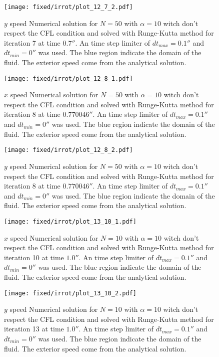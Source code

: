 \begin{figure}
\texttt{[image: fixed/irrot/plot\_12\_7\_2.pdf]}
\caption{$y$ speed Numerical solution for $N=50$ with $\alpha=10$ witch don't respect the CFL condition and solved with Runge-Kutta method
for iteration 7 at time $\unit{0.7}{\second}$.
An time step limiter of $dt_{max}=\unit{0.1}{\second}$ and $dt_{min}=\unit{0}{\second}$ was used.
The blue region indicate the domain of the fluid. The exterior speed come from the analytical solution.
}
\end{figure}
\begin{figure}
\texttt{[image: fixed/irrot/plot\_12\_8\_1.pdf]}
\caption{$x$ speed Numerical solution for $N=50$ with $\alpha=10$ witch don't respect the CFL condition and solved with Runge-Kutta method
for iteration 8 at time $\unit{0.770046}{\second}$.
An time step limiter of $dt_{max}=\unit{0.1}{\second}$ and $dt_{min}=\unit{0}{\second}$ was used.
The blue region indicate the domain of the fluid. The exterior speed come from the analytical solution.
}
\end{figure}
\begin{figure}
\texttt{[image: fixed/irrot/plot\_12\_8\_2.pdf]}
\caption{$y$ speed Numerical solution for $N=50$ with $\alpha=10$ witch don't respect the CFL condition and solved with Runge-Kutta method
for iteration 8 at time $\unit{0.770046}{\second}$.
An time step limiter of $dt_{max}=\unit{0.1}{\second}$ and $dt_{min}=\unit{0}{\second}$ was used.
The blue region indicate the domain of the fluid. The exterior speed come from the analytical solution.
}
\end{figure}

\begin{figure}
\texttt{[image: fixed/irrot/plot\_13\_10\_1.pdf]}
\caption{$x$ speed Numerical solution for $N=10$ with $\alpha=10$ witch don't respect the CFL condition and solved with Runge-Kutta method
for iteration 10 at time $\unit{1.0}{\second}$.
An time step limiter of $dt_{max}=\unit{0.1}{\second}$ and $dt_{min}=\unit{0}{\second}$ was used.
The blue region indicate the domain of the fluid. The exterior speed come from the analytical solution.
}
\end{figure}
\begin{figure}
\texttt{[image: fixed/irrot/plot\_13\_10\_2.pdf]}
\caption{$y$ speed Numerical solution for $N=10$ with $\alpha=10$ witch don't respect the CFL condition and solved with Runge-Kutta method
for iteration 13 at time $\unit{1.0}{\second}$.
An time step limiter of $dt_{max}=\unit{0.1}{\second}$ and $dt_{min}=\unit{0}{\second}$ was used.
The blue region indicate the domain of the fluid. The exterior speed come from the analytical solution.
}
\end{figure}

